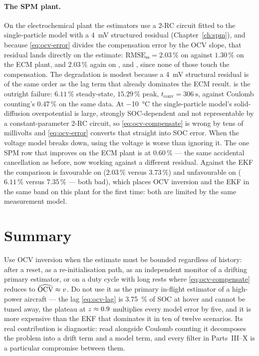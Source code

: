 \paragraph{The SPM plant.} On the electrochemical plant the estimators use a 2-RC circuit fitted to
the single-particle model with a \SI{4}{\milli\volt} structured residual (Chapter~\ref{ch:spm}), and
because \eqref{eq:ocv-error} divides the compensation error by the OCV slope, that residual lands
directly on the estimate: $\text{RMSE}_{\text{ss}} = 2.03\,\%$ on  against
$1.30\,\%$ on the ECM plant, and $2.03\,\%$ again on ,  and
, since none of those touch the compensation. The degradation is modest
because a \SI{4}{\milli\volt} structural residual is of the same order as the lag term that already
dominates the ECM result.  is the outright failure: $6.11\,\%$ steady-state,
$15.29\,\%$ peak, $t_{\text{conv}} = \SI{306}{\second}$, against Coulomb counting's $0.47\,\%$ on
the same data. At \SI{-10}{\celsius} the single-particle model's solid-diffusion overpotential is
large, strongly SOC-dependent and not representable by a constant-parameter 2-RC circuit, so
\eqref{eq:ocv-compensate} is wrong by tens of millivolts and \eqref{eq:ocv-error} converts that
straight into SOC error. When the voltage model breaks down, using the voltage is worse than
ignoring it. The one SPM row that improves on the ECM plant is  at
$0.60\,\%$ --- the same accidental cancellation as before, now working against a different residual.
Against the EKF the comparison is favourable on  ($2.03\,\%$ versus $3.73\,\%$) and
unfavourable on  ($6.11\,\%$ versus $7.35\,\%$ --- both bad), which places OCV inversion
and the EKF in the same band on this plant for the first time: both are limited by the same
measurement model.

\section{Summary}
Use OCV inversion when the estimate must be bounded regardless of history: after a reset, as a
re-initialisation path, as an independent monitor of a drifting primary estimator, or on a duty
cycle with long rests where \eqref{eq:ocv-compensate} reduces to $\widehat{\mathrm{OCV}}\approx v$. Do not
use it as the primary in-flight estimator of a high-power aircraft --- the lag \eqref{eq:ocv-lag} is
\SI{3.75}{\percent} of SOC at hover and cannot be tuned away, the plateau at $z\approx0.9$
multiplies every model error by five, and it is more expensive than the EKF that dominates it in ten
of twelve scenarios. Its real contribution is diagnostic: read alongside Coulomb counting it
decomposes the problem into a drift term and a model term, and every filter in Parts~III--X is a
particular compromise between them.
